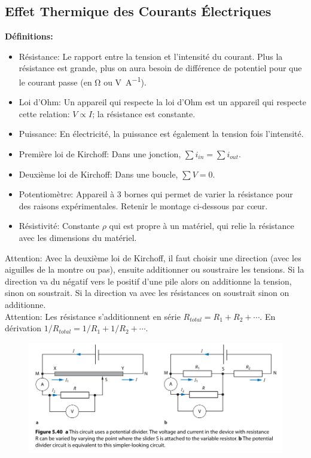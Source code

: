\documentclass[french, a4paper, 12pt]{article}
\begin{document}
\subsection{Effet Thermique des Courants Électriques}
\textbf{Définitions:}
\begin{itemize}
\item Résistance: Le rapport entre la tension et l'intensité du courant. Plus la résistance est grande, plus on aura besoin de différence de potentiel pour que le courant passe (en \si{\ohm} ou \si{\volt\per\ampere}).
\item Loi d'Ohm: Un appareil qui respecte la loi d'Ohm est un appareil qui respecte cette relation: $V \propto I$; la résistance est constante.
\item Puissance: En électricité, la puissance est également la tension fois l'intensité.
\item Première loi de Kirchoff: Dans une jonction, $\sum i_{in} = \sum i_{out}$.
\item Deuxième loi de Kirchoff: Dans une boucle, $\sum V=0$.
\item Potentiomètre: Appareil à 3 bornes qui permet de varier la résistance pour des raisons expérimentales. Retenir le montage ci-dessous par cœur.
\item Résistivité: Constante $\rho$ qui est propre à un matériel, qui relie la résistance avec les dimensions du matériel.
\end{itemize}
Attention: Avec la deuxième loi de Kirchoff, il faut choisir une direction (avec les aiguilles de la montre ou pas), ensuite additionner ou soustraire les tensions. Si la direction va du négatif vers le positif d'une pile alors on additionne la tension, sinon on soustrait. Si la direction va avec les résistances on soustrait sinon on additionne.\\
Attention: Les résistance s'additionnent en série $R_{total}=R_1+R_2+\cdots$. En dérivation $1/R_{total}=1/R_1+1/R_2+\cdots$.
\begin{figure}[H]
\centering
\includegraphics[scale=0.6]{potential_divider}
\end{figure}
\end{document}
